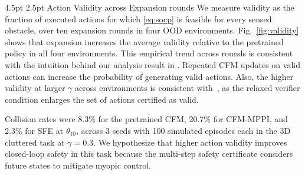 \documentclass[letterpaper, 10 pt, conference]{ieeeconf}
\makeatletter
\renewcommand{\subsection}{%
  \@startsection{subsection}{2}{\z@}%
  {4.5pt}%
  {2.5pt}%
  {\normalfont\normalsize\itshape}}
\makeatother
\begin{document}
\subsection{Action Validity across Expansion rounds}
We measure validity as the fraction of executed actions for which \eqref{eq:socp} is feasible for every sensed obstacle, over ten expansion rounds in four OOD environments. Fig.~\ref{fig:validity} shows that expansion increases the average validity relative to the pretrained policy in all four environments. 
This empirical trend across rounds is consistent with the intuition behind our analysis result in . Repeated CFM updates on valid actions can increase the probability of generating valid actions. 
Also, the higher validity at larger $\gamma$ across environments is consistent with~, as the relaxed verifier condition enlarges the set of actions certified as valid.

Collision rates were 8.3\% for the pretrained CFM, 20.7\% for CFM-MPPI, and 2.3\% for SFE at $\theta_{10}$, across 3 seeds with 100 simulated episodes each in the 3D cluttered task at $\gamma=0.3$. 
We hypothesize that higher action validity improves closed-loop safety in this task because the multi-step safety certificate considers future states to mitigate myopic control.
\end{document}
